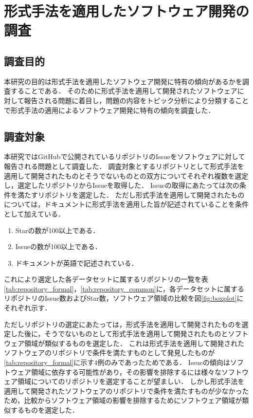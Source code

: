 \documentclass[main]{subfiles}
\begin{document}
\chapter{形式手法を適用したソフトウェア開発の調査}

\section{調査目的}

本研究の目的は形式手法を適用したソフトウェア開発に特有の傾向があるかを調査することである．
そのために形式手法を適用して開発されたソフトウェアに対して報告される問題に着目し，問題の内容をトピック分析により分類することで形式手法の適用によるソフトウェア開発に特有の傾向を調査した．

\section{調査対象}
\label{sec:survey-target}

本研究ではGitHubで公開されているリポジトリのIssueをソフトウェアに対して報告される問題として調査した．
調査対象とするリポジトリとして形式手法を適用して開発されたものとそうでないものとの双方についてそれぞれ複数を選定し，選定したリポジトリからIssueを取得した．
Issueの取得にあたっては次の条件を満たすリポジトリを選定した．
ただし形式手法を適用して開発されたものについては，ドキュメントに形式手法を適用した旨が記述されていることを条件として加えている．

\begin{enumerate}
	\item Starの数が100以上である．
	\item Issueの数が100以上である．
	\item ドキュメントが英語で記述されている．
\end{enumerate}

これにより選定した各データセットに属するリポジトリの一覧を表\ref{tab:repository_formal}，\ref{tab:repository_common}に，各データセットに属するリポジトリのIssue数およびStar数，ソフトウェア領域の比較を図\ref{fig:boxplot}にそれぞれ示す．

ただしリポジトリの選定にあたっては，形式手法を適用して開発されたものを選定した後に，そうでないものとして形式手法を適用して開発されたものとソフトウェア領域が類似するものを選定した．
これは形式手法を適用して開発されたソフトウェアのリポジトリで条件を満たすものとして発見したものが\ref{tab:repository_formal}に示す4例のみであったためである．
Issueの傾向はソフトウェア領域に依存する可能性があり，その影響を排除するには様々なソフトウェア領域についてのリポジトリを選定することが望ましい．
しかし形式手法を適用して開発されたソフトウェアのリポジトリで条件を満たすものが少なかったため，比較からソフトウェア領域の影響を排除するためにソフトウェア領域が類似するものを選定した．
\end{document}
